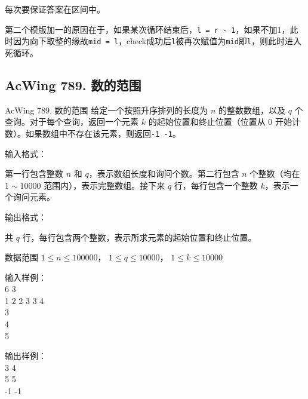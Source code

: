 \begin{keypoint}
    每次要保证答案在区间中。

    第二个模版加一的原因在于，如果某次循环结束后，\lstinline{l = r - 1}，如果不加1，此时因为向下取整的缘故\lstinline{mid = l}，check成功后\lstinline{l}被再次赋值为\lstinline{mid}即\lstinline{l}，则此时进入死循环。
\end{keypoint}

\subsection{AcWing 789. 数的范围}
\begin{titledbox}{AcWing 789. 数的范围}
    给定一个按照升序排列的长度为 $n$ 的整数数组，以及 $q$ 个查询。对于每个查询，返回一个元素 $k$ 的起始位置和终止位置（位置从 $0$ 开始计数）。如果数组中不存在该元素，则返回\lstinline{-1 -1}。

    输入格式：

    第一行包含整数 $n$ 和 $q$，表示数组长度和询问个数。第二行包含 $n$ 个整数（均在 $1 \sim 10000$ 范围内），表示完整数组。接下来 $q$ 行，每行包含一个整数 $k$，表示一个询问元素。

    输出格式：

    共 $q$ 行，每行包含两个整数，表示所求元素的起始位置和终止位置。

    数据范围
    $1 \le n \le 100000$，
    $1 \le q \le 10000$，
    $1 \le k \le 10000$

    \begin{minipage}[t]{.5\textwidth}
        输入样例：\\
        6 3 \\
        1 2 2 3 3 4 \\
        3 \\
        4 \\
        5
    \end{minipage}%
    \begin{minipage}[t]{.5\textwidth}
        输出样例：\\
        3 4 \\
        5 5 \\
        -1 -1
    \end{minipage}
\end{titledbox}


